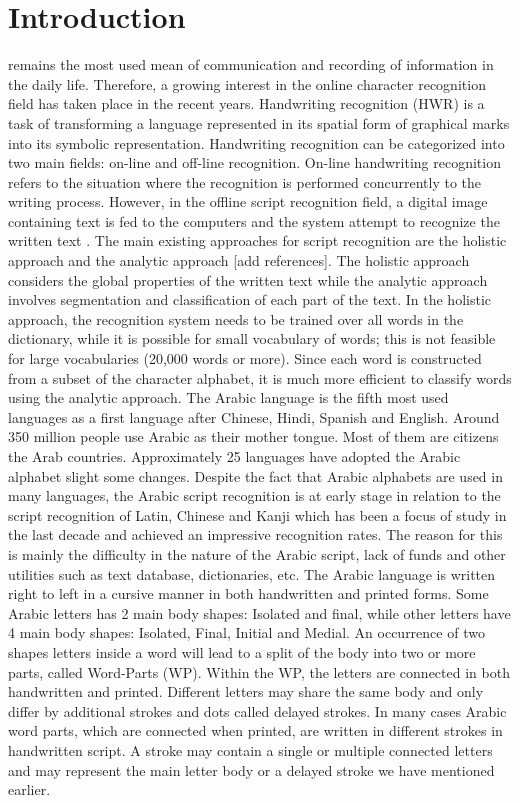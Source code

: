 \documentclass[12pt,journal,compsoc]{IEEEtran}
\begin{document}
\section{Introduction}

 remains the most used mean of communication and recording of information in the daily life. Therefore, a growing interest in the online character recognition field has taken place in the recent years.
Handwriting recognition (HWR) is a task of transforming a language represented in its spatial form of graphical marks into its symbolic representation. Handwriting recognition can be categorized into two main fields: on-line and off-line recognition. On-line handwriting recognition refers to the situation where the recognition is performed concurrently to the writing process. However, in the offline script recognition field, a digital image containing text is fed to the computers and the system attempt to recognize the written text \cite{al2011online}. The main existing approaches for script recognition are the holistic approach \cite{biadsy2011segmentation} and the analytic approach [add references]. The holistic approach considers the global properties of the written text while the analytic approach involves segmentation and classification of each part of the text.  In the holistic approach, the recognition system needs to be trained over all words in the dictionary, while it is possible for small vocabulary of words; this is not feasible for large vocabularies (20,000 words or more). Since each word is constructed from a subset of the character alphabet, it is much more efficient to classify words using the analytic approach. \cite{elanwar2012unconstrained}
The Arabic language is the fifth most used languages as a first language after Chinese, Hindi, Spanish and English. Around 350 million people use Arabic as their mother tongue. Most of them are citizens the Arab countries. Approximately 25 languages have adopted the Arabic alphabet slight some changes. Despite the fact that Arabic alphabets are used in many languages, the Arabic script recognition is at early stage in relation to the script recognition of Latin, Chinese and Kanji which has been a focus of study in the last decade and achieved an impressive recognition rates. The reason for this is mainly the difficulty in the nature of the Arabic script, lack of funds and other utilities such as text database, dictionaries, etc. \cite{zeki2011segmentation}
The Arabic language is written right to left in a cursive manner in both handwritten and printed forms. Some Arabic letters has 2 main body shapes: Isolated and final, while other letters have 4 main body shapes: Isolated, Final, Initial and Medial. An occurrence of two shapes letters inside a word will lead to a split of the body into two or more parts, called Word-Parts (WP). Within the WP, the letters are connected in both handwritten and printed. Different letters may share the same body and only differ by additional strokes and dots called delayed strokes. In many cases Arabic word parts, which are connected when printed, are written in different strokes in handwritten script. A stroke may contain a single or multiple connected letters and may represent the main letter body or a delayed stroke we have mentioned earlier.
 
\end{document}
